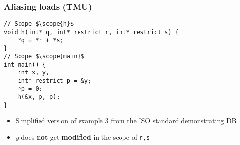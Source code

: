 \begin{frame}[fragile]
\frametitle{Aliasing loads (TMU)}
\begin{minipage}{0.7\textwidth}
\begin{verbatim}
// Scope $\scope{h}$
void h(int* q, int* restrict r, int* restrict s) {
    *q = *r + *s; 
}
// Scope $\scope{main}$
int main() {
    int x, y;
    int* restrict p = &y;
    *p = 0; 
    h(&x, p, p);
}
\end{verbatim}
\end{minipage}%
\begin{minipage}[t]{0.3\textwidth}
\end{minipage}

\begin{itemize}
    \item Simplified version of example 3 from the ISO standard demonstrating DB
    \item $y$ does \textbf{not} get \textbf{modified} in the scope  of \texttt{r,s}
\end{itemize}

\end{frame}




